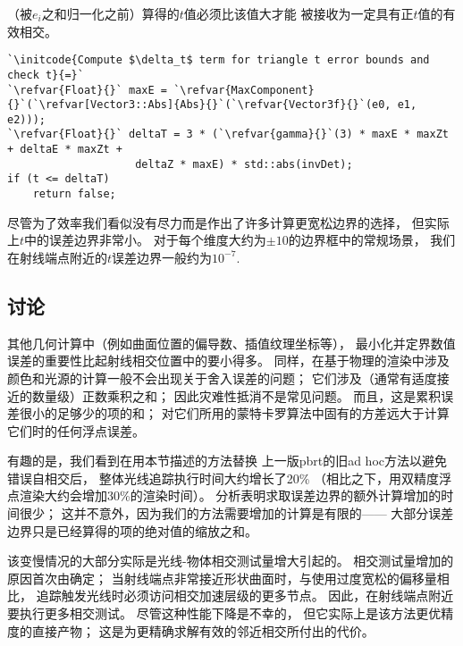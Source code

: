 （被$e_i$之和归一化之前）算得的$t$值必须比该值大才能
被接收为一定具有正$t$值的有效相交。
\begin{lstlisting}
`\initcode{Compute $\delta_t$ term for triangle t error bounds and check t}{=}`
`\refvar{Float}{}` maxE = `\refvar{MaxComponent}{}`(`\refvar[Vector3::Abs]{Abs}{}`(`\refvar{Vector3f}{}`(e0, e1, e2)));
`\refvar{Float}{}` deltaT = 3 * (`\refvar{gamma}{}`(3) * maxE * maxZt + deltaE * maxZt +
                    deltaZ * maxE) * std::abs(invDet);
if (t <= deltaT)
    return false;
\end{lstlisting}

尽管为了效率我们看似没有尽力而是作出了许多计算更宽松边界的选择，
但实际上$t$中的误差边界非常小。
对于每个维度大约为$\pm10$的边界框中的常规场景，
我们在射线端点附近的$t$误差边界一般约为$10^{-7}$.

\subsection{讨论}\label{sub:讨论}
其他几何计算中（例如曲面位置的偏导数、插值纹理坐标等），
最小化并定界数值误差的重要性比起射线相交位置中的要小得多。
同样，在基于物理的渲染中涉及颜色和光源的计算一般不会出现关于舍入误差的问题；
它们涉及（通常有适度接近的数量级）正数乘积之和；
因此灾难性抵消不是常见问题。
而且，这是累积误差很小的足够少的项的和；
对它们所用的蒙特卡罗算法中固有的方差远大于计算它们时的任何浮点误差。

有趣的是，我们看到在用本节描述的方法替换
上一版pbrt的旧ad hoc方法以避免错误自相交后，
整体光线追踪执行时间大约增长了20\%
（相比之下，用双精度浮点渲染大约会增加30\%的渲染时间）。
分析表明求取误差边界的额外计算增加的时间很少；
这并不意外，因为我们的方法需要增加的计算是有限的——
大部分误差边界只是已经算得的项的绝对值的缩放之和。

该变慢情况的大部分实际是光线-物体相交测试量增大引起的。
相交测试量增加的原因首次由\citet[p.30]{Wächter_2008}确定；
当射线端点非常接近形状曲面时，与使用过度宽松的偏移量相比，
追踪触发光线时必须访问相交加速层级的更多节点。
因此，在射线端点附近要执行更多相交测试。
尽管这种性能下降是不幸的，
但它实际上是该方法更优精度的直接产物；
这是为更精确求解有效的邻近相交所付出的代价。